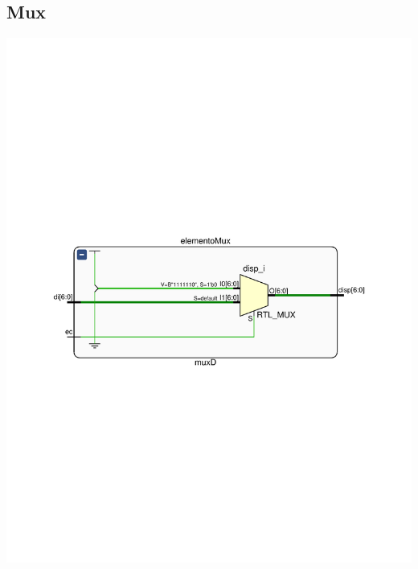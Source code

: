 \documentclass[8pt,executivepaper]{article}
\begin{document}
\subsection{Mux}
\begin{center}
  \includegraphics[scale=0.4]{rtl/muxD.pdf}
\end{center}
\end{document}
